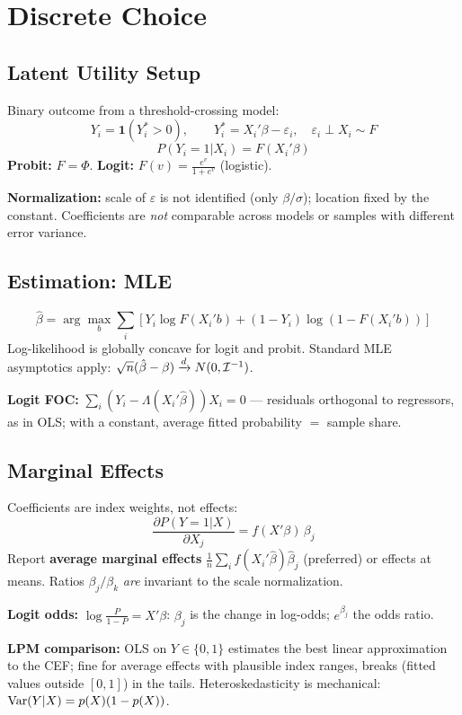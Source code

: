 \section{Discrete Choice}

\subsection{Latent Utility Setup}
Binary outcome from a threshold-crossing model:
$$Y_i = \mathbf{1}(Y_i^* > 0), \qquad Y_i^* = X_i'\beta - \varepsilon_i, \quad \varepsilon_i \perp X_i \sim F$$
$$P(Y_i=1|X_i) = F(X_i'\beta)$$
\textbf{Probit:} $F = \Phi$. \textbf{Logit:} $F(v) = \frac{e^v}{1+e^v}$ (logistic).

\textbf{Normalization:} scale of $\varepsilon$ is not identified (only $\beta/\sigma$); location fixed by the constant. Coefficients are \textit{not} comparable across models or samples with different error variance.

\subsection{Estimation: MLE}
$$\hat\beta = \arg\max_b \sum_i \left[Y_i \log F(X_i'b) + (1-Y_i)\log(1-F(X_i'b))\right]$$
Log-likelihood is globally concave for logit and probit. Standard MLE asymptotics apply: $\sqrt{n}(\hat\beta - \beta) \xrightarrow{d} N(0, \mathcal{I}^{-1})$.

\textbf{Logit FOC:} $\sum_i (Y_i - \Lambda(X_i'\hat\beta))X_i = 0$ --- residuals orthogonal to regressors, as in OLS; with a constant, average fitted probability $=$ sample share.

\subsection{Marginal Effects}
Coefficients are index weights, not effects:
$$\frac{\partial P(Y=1|X)}{\partial X_j} = f(X'\beta)\,\beta_j$$
Report \textbf{average marginal effects} $\frac{1}{n}\sum_i f(X_i'\hat\beta)\hat\beta_j$ (preferred) or effects at means. Ratios $\beta_j/\beta_k$ \textit{are} invariant to the scale normalization.

\textbf{Logit odds:} $\log\frac{P}{1-P} = X'\beta$: $\beta_j$ is the change in log-odds; $e^{\beta_j}$ the odds ratio.

\textbf{LPM comparison:} OLS on $Y \in \{0,1\}$ estimates the best linear approximation to the CEF; fine for average effects with plausible index ranges, breaks (fitted values outside $[0,1]$) in the tails. Heteroskedasticity is mechanical: $\text{Var}(Y|X) = p(X)(1-p(X))$.

